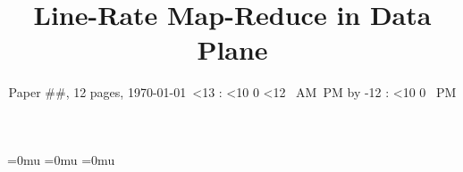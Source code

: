 \documentclass[twocolumn]{sig-alternate-10pt}
\def\drafttime{\ifnum \hour<13 \number\hour:%
                      \ifnum \minute<10 0\fi
                      \number\minute
                      \ifnum \hour<12 \ AM\else \ PM\fi
         \else \advance \hour by -12 \number\hour:%
                      \ifnum \minute<10 0\fi
                      \number\minute \ PM\fi}
\def\timestamp{\today \ \drafttime}
\begin{document}
%

\title{Line-Rate Map-Reduce in Data Plane}
\author{Paper $\#\#$, 12 pages, \timestamp}
\maketitle

\setlength{\textfloatsep}{0pt}%
\medmuskip=0mu\relax %
\thinmuskip=0mu\relax %
\thickmuskip=0mu\relax %










\clearpage


%

\clearpage


\end{document}
